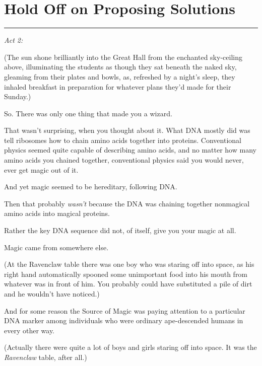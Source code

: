 \chapter{Hold Off on Proposing
Solutions}\label{hold-off-on-proposing-solutions}

\begin{center}\rule{3in}{0.4pt}\end{center}

\emph{Act 2:}

(The sun shone brilliantly into the Great Hall from the enchanted
sky-ceiling above, illuminating the students as though they sat beneath
the naked sky, gleaming from their plates and bowls, as, refreshed by a
night's sleep, they inhaled breakfast in preparation for whatever plans
they'd made for their Sunday.)

So. There was only one thing that made you a wizard.

That wasn't surprising, when you thought about it. What DNA mostly did
was tell ribosomes how to chain amino acids together into proteins.
Conventional physics seemed quite capable of describing amino acids, and
no matter how many amino acids you chained together, conventional
physics said you would never, ever get magic out of it.

And yet magic seemed to be hereditary, following DNA.

Then that probably \emph{wasn't} because the DNA was chaining together
nonmagical amino acids into magical proteins.

Rather the key DNA sequence did not, of itself, give you your magic at
all.

Magic came from somewhere else.

(At the Ravenclaw table there was one boy who was staring off into
space, as his right hand automatically spooned some unimportant food
into his mouth from whatever was in front of him. You probably could
have substituted a pile of dirt and he wouldn't have noticed.)

And for some reason the Source of Magic was paying attention to a
particular DNA marker among individuals who were ordinary ape-descended
humans in every other way.

(Actually there were quite a lot of boys and girls staring off into
space. It was the \emph{Ravenclaw} table, after all.)

